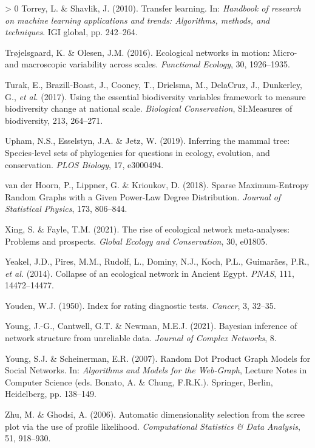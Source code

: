 \documentclass[10pt,oneside]{article}
\newlength{\cslhangindent}
\newenvironment{CSLReferences}[3] %
 {%
  \setlength{\parindent}{0pt}
  \ifodd #1 \everypar{\setlength{\hangindent}{\cslhangindent}}\ignorespaces\fi
  \ifnum #2 > 0
  \setlength{\parskip}{#2\baselineskip}
  \fi
 }%
 {}
\begin{document}
\begin{CSLReferences}{1}{0}
\leavevmode\hypertarget{ref-Torrey2010TraLea}{}%
Torrey, L. \& Shavlik, J. (2010). Transfer learning. In: \emph{Handbook
of research on machine learning applications and trends: Algorithms,
methods, and techniques}. IGI global, pp. 242--264.

\leavevmode\hypertarget{ref-Trojelsgaard2016EcoNet}{}%
Trøjelsgaard, K. \& Olesen, J.M. (2016). Ecological networks in motion:
Micro- and macroscopic variability across scales. \emph{Functional
Ecology}, 30, 1926--1935.

\leavevmode\hypertarget{ref-Turak2017UsiEss}{}%
Turak, E., Brazill-Boast, J., Cooney, T., Drielsma, M., DelaCruz, J.,
Dunkerley, G., \emph{et al.} (2017). Using the essential biodiversity
variables framework to measure biodiversity change at national scale.
\emph{Biological Conservation}, SI:Measures of biodiversity, 213,
264--271.

\leavevmode\hypertarget{ref-Upham2019InfMam}{}%
Upham, N.S., Esselstyn, J.A. \& Jetz, W. (2019). Inferring the mammal
tree: Species-level sets of phylogenies for questions in ecology,
evolution, and conservation. \emph{PLOS Biology}, 17, e3000494.

\leavevmode\hypertarget{ref-vanderHoorn2018SpaMax}{}%
van der Hoorn, P., Lippner, G. \& Krioukov, D. (2018). Sparse
Maximum-Entropy Random Graphs with a Given Power-Law Degree
Distribution. \emph{Journal of Statistical Physics}, 173, 806--844.

\leavevmode\hypertarget{ref-Xing2021RisEco}{}%
Xing, S. \& Fayle, T.M. (2021). The rise of ecological network
meta-analyses: Problems and prospects. \emph{Global Ecology and
Conservation}, 30, e01805.

\leavevmode\hypertarget{ref-Yeakel2014ColEco}{}%
Yeakel, J.D., Pires, M.M., Rudolf, L., Dominy, N.J., Koch, P.L.,
Guimarães, P.R., \emph{et al.} (2014). Collapse of an ecological network
in Ancient Egypt. \emph{PNAS}, 111, 14472--14477.

\leavevmode\hypertarget{ref-Youden1950IndRat}{}%
Youden, W.J. (1950). Index for rating diagnostic tests. \emph{Cancer},
3, 32--35.

\leavevmode\hypertarget{ref-Young2021BayInf}{}%
Young, J.-G., Cantwell, G.T. \& Newman, M.E.J. (2021). Bayesian
inference of network structure from unreliable data. \emph{Journal of
Complex Networks}, 8.

\leavevmode\hypertarget{ref-Young2007RanDot}{}%
Young, S.J. \& Scheinerman, E.R. (2007). Random Dot Product Graph Models
for Social Networks. In: \emph{Algorithms and Models for the Web-Graph},
Lecture Notes in Computer Science (eds. Bonato, A. \& Chung, F.R.K.).
Springer, Berlin, Heidelberg, pp. 138--149.

\leavevmode\hypertarget{ref-Zhu2006AutDim}{}%
Zhu, M. \& Ghodsi, A. (2006). Automatic dimensionality selection from
the scree plot via the use of profile likelihood. \emph{Computational
Statistics \& Data Analysis}, 51, 918--930.

\end{CSLReferences}
\end{document}

